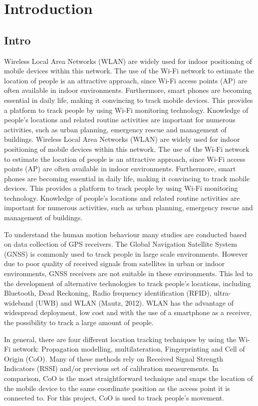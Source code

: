 \chapter{Introduction}\label{Introduction}
\section{Intro}\label{intro}
Wireless Local Area Networks (WLAN) are widely used for indoor positioning of mobile devices within this network. The use of the Wi-Fi network to estimate the location of people is an attractive approach, since Wi-Fi access points (AP) are often available in indoor environments. Furthermore, smart phones are becoming essential in daily life, making it convincing to track mobile devices. This provides a platform to track people by using Wi-Fi monitoring technology. Knowledge of people’s locations and related routine activities are important for numerous activities, such as urban planning, emergency rescue and management of buildings. \citep{mautz2012indoor}
Wireless Local Area Networks (WLAN) are widely used for indoor positioning of mobile devices within this network. The use of the Wi-Fi network to estimate the location of people is an attractive approach, since Wi-Fi access points (AP) are often available in indoor environments. Furthermore, smart phones are becoming essential in daily life, making it convincing to track mobile devices. This provides a platform to track people by using Wi-Fi monitoring technology. Knowledge of people’s locations and related routine activities are important for numerous activities, such as urban planning, emergency rescue and management of buildings.

To understand the human motion behaviour many studies are conducted based on data collection of GPS receivers. The Global Navigation Satellite System (GNSS) is commonly used to track people in large scale environments. However due to poor quality of received signals from satellites in urban or indoor environments, GNSS receivers are not suitable in these environments. This led to the development of alternative technologies to track people’s locations, including Bluetooth, Dead Reckoning, Radio frequency identification (RFID), ultra-wideband (UWB) and WLAN (Mautz, 2012). WLAN has the advantage of widespread deployment, low cost and with the use of a smartphone as a receiver, the possibility to track a large amount of people.  

In general, there are four different location tracking techniques by using the Wi-Fi network: Propagation modelling, multilateration, Fingerprinting and Cell of Origin (CoO). Many of these methods rely on Received Signal Strength Indicators (RSSI) and/or previous set of calibration measurements. In comparison, CoO is the most straightforward technique and snaps the location of the mobile device to the same coordinate position as the access point it is connected to. For this project, CoO is used to track people’s movement.

